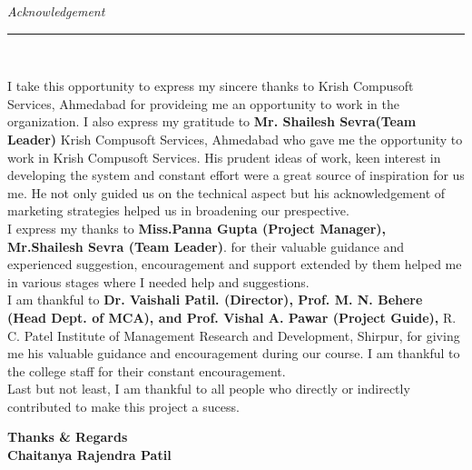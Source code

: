\thispagestyle{empty}
\begin{flushright}
\textit{\Large \textcolor{black} Acknowledgement}\
\rule{6in}{.1pt}\\[0.5cm]
\end{flushright}
\justifying
\begin{spacing}{1.5}
I take this opportunity to express my sincere thanks to Krish Compusoft Services, Ahmedabad for provideing me an opportunity to work in the organization. I also express my gratitude to \textbf{Mr. Shailesh Sevra(Team Leader)} Krish Compusoft Services, Ahmedabad who gave me the opportunity to work in Krish Compusoft Services. His prudent ideas of work, keen interest in developing the system and constant effort were a great source of inspiration for us me. He not only guided us on the technical aspect but his acknowledgement of marketing strategies helped us in broadening our prespective.\\
	 I express my thanks to \textbf { Miss.Panna Gupta (Project Manager), Mr.Shailesh Sevra (Team Leader)}. for their valuable guidance and experienced suggestion, encouragement and support extended by them helped me in various stages where I needed help and suggestions.\\
	 I am thankful to \textbf{Dr. Vaishali Patil. (Director), Prof. M. N. Behere (Head Dept. of MCA), and Prof. Vishal A. Pawar (Project Guide),  } R. C. Patel Institute of Management Research and Development, Shirpur, for giving me his valuable guidance and encouragement during our course. I am thankful to the college staff for their constant encouragement.\\
	 Last but not least, I am thankful to all people who directly or indirectly contributed to make this project a sucess.\\

	
 	
	
	
\begin{flushright}
\begin{spacing}{1}
\textbf{Thanks \& Regards}\\[.03cm]
\textbf{Chaitanya Rajendra Patil}\\[.01cm]

\end{spacing}
\end{flushright}
\end{spacing}

